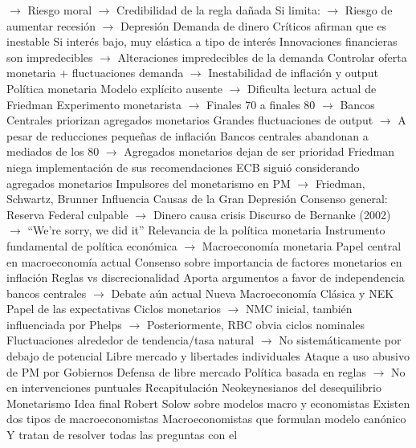 \documentclass{nuevotema}
\begin{document}
\begin{esquemal}
				\4[] $\to$ Riesgo moral
				\4[] $\to$ Credibilidad de la regla dañada
				\4[] Si limita:
				\4[] $\to$ Riesgo de aumentar recesión $\to$ Depresión
				\4 Demanda de dinero
				\4[] Críticos afirman que es inestable
				\4[] Si interés bajo, muy elástica a tipo de interés
				\4[] Innovaciones financieras son impredecibles
				\4[] $\to$ Alteraciones impredecibles de la demanda
				\4[] Controlar oferta monetaria + fluctuaciones demanda
				\4[] $\to$ Inestabilidad de inflación y output
				\4 Política monetaria
				\4[] Modelo explícito ausente
				\4[] $\to$ Dificulta lectura actual de Friedman
				\4[] Experimento monetarista
				\4[] $\to$ Finales 70 a finales 80
				\4[] $\to$ Bancos Centrales priorizan agregados monetarios
				\4[] Grandes fluctuaciones de output
				\4[] $\to$ A pesar de reducciones pequeñas de inflación
				\4[] Bancos centrales abandonan a mediados de los 80
				\4[] $\to$ Agregados monetarios dejan de ser prioridad
				\4[] Friedman niega implementación de sus recomendaciones
				\4[] ECB siguió considerando agregados monetarios
				\4 Impulsores del monetarismo en PM
				\4[] $\to$ Friedman, Schwartz, Brunner
			\3 Influencia
				\4 Causas de la Gran Depresión
				\4[] Consenso general: Reserva Federal culpable
				\4[] $\to$ Dinero causa crisis
				\4[] Discurso de Bernanke (2002)
				\4[] $\to$ ``We're sorry, we did it''
				\4 Relevancia de la política monetaria
				\4[] Instrumento fundamental de política económica
				\4[] $\to$ Macroeconomía monetaria
				\4[] Papel central en macroeconomía actual
				\4[] Consenso sobre importancia de factores monetarios en inflación
				\4[] Reglas vs discrecionalidad
				\4[] Aporta argumentos a favor de independencia bancos centrales
				\4[] $\to$ Debate aún actual
				\4 Nueva Macroeconomía Clásica y NEK
				\4[] Papel de las expectativas
				\4[] Ciclos monetarios
				\4[] $\to$ NMC inicial, también influenciada por Phelps
				\4[] $\to$ Posteriormente, RBC obvia ciclos nominales
				\4[] Fluctuaciones alrededor de tendencia/tasa natural
				\4[] $\to$ No sistemáticamente por debajo de potencial
				\4 Libre mercado y libertades individuales
				\4[] Ataque a uso abusivo de PM por Gobiernos
				\4[] Defensa de libre mercado
				\4[] Política basada en reglas
				\4[] $\to$ No en intervenciones puntuales
	\1[] 
		\2 Recapitulación
			\3 Neokeynesianos del desequilibrio
			\3 Monetarismo
		\2 Idea final
			\3 Robert Solow sobre modelos macro y economistas
				\4 Existen dos tipos de macroeconomistas
				\4 Macroeconomistas que formulan modelo canónico
				\4[] Y tratan de resolver todas las preguntas con el

\end{esquemal}
\end{document}
